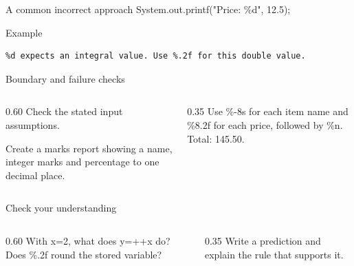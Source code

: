 \documentclass[10pt,aspectratio=169]{beamer}
\begin{document}
\begin{frame}[fragile,t]{A common incorrect approach}
System.out.printf("Price: \%d", 12.5);
\vspace{1mm}\begin{block}{Example}
\begin{lstlisting}
%d expects an integral value. Use %.2f for this double value.
\end{lstlisting}
\end{block}
\end{frame}

\begin{frame}[fragile,t]{Boundary and failure checks}
\begin{columns}[T,onlytextwidth]\begin{column}{0.60\textwidth}
Check the stated input assumptions.

Create a marks report showing a name, integer marks and percentage to one decimal place.
\end{column}\begin{column}{0.35\textwidth}\small
Use \%-8s for each item name and \%8.2f for each price, followed by \%n. Total: 145.50.
\end{column}\end{columns}
\end{frame}

\begin{frame}[fragile,t]{Check your understanding}
\begin{columns}[T,onlytextwidth]\begin{column}{0.60\textwidth}
With x=2, what does y=++x do? Does \%.2f round the stored variable?
\end{column}\begin{column}{0.35\textwidth}\small
Write a prediction and explain the rule that supports it.
\end{column}\end{columns}
\end{frame}
\end{document}
